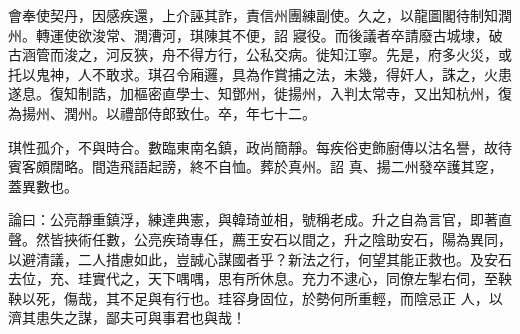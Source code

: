 \begin{pinyinscope}
 會奉使契丹，因感疾還，上介誣其詐，責信州團練副使。久之，以龍圖閣待制知潤州。轉運使欲浚常、潤漕河，琪陳其不便，詔
 寢役。而後議者卒請廢古城埭，破古涵管而浚之，河反狹，舟不得方行，公私交病。徙知江寧。先是，府多火災，或托以鬼神，人不敢求。琪召令廂邏，具為作賞捕之法，未幾，得奸人，誅之，火患遂息。復知制誥，加樞密直學士、知鄧州，徙揚州，入判太常寺，又出知杭州，復為揚州、潤州。以禮部侍郎致仕。卒，年七十二。



 琪性孤介，不與時合。數臨東南名鎮，政尚簡靜。每疾俗吏飾廚傳以沽名譽，故待賓客頗闊略。間造飛語起謗，終不自恤。葬於真州。詔
 真、揚二州發卒護其窆，蓋異數也。



 論曰：公亮靜重鎮浮，練達典憲，與韓琦並相，號稱老成。升之自為言官，即著直聲。然皆挾術任數，公亮疾琦專任，薦王安石以間之，升之陰助安石，陽為異同，以避清議，二人措慮如此，豈誠心謀國者乎？新法之行，何望其能正救也。及安石去位，充、珪實代之，天下喁喁，思有所休息。充力不逮心，同僚左掣右伺，至鞅鞅以死，傷哉，其不足與有行也。珪容身固位，於勢何所重輕，而陰忌正
 人，以濟其患失之謀，鄙夫可與事君也與哉！



\end{pinyinscope}